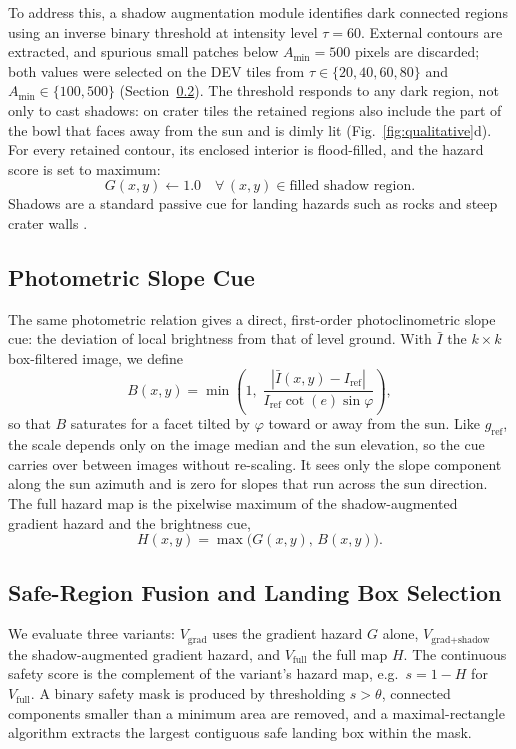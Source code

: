 \documentclass{article}
\begin{document}
To address this, a shadow augmentation module identifies dark connected regions using an inverse binary threshold at intensity level $\tau = 60$. External contours are extracted, and spurious small patches below $A_{\min} = 500$ pixels are discarded; both values were selected on the DEV tiles from $\tau \in \{20, 40, 60, 80\}$ and $A_{\min} \in \{100, 500\}$ (Section~\ref{sec:fusion}). The threshold responds to any dark region, not only to cast shadows: on crater tiles the retained regions also include the part of the bowl that faces away from the sun and is dimly lit (Fig.~\ref{fig:qualitative}d). For every retained contour, its enclosed interior is flood-filled, and the hazard score is set to maximum:
\begin{equation}
    G(x,y) \leftarrow 1.0 \quad \forall\,(x,y) \in \text{filled shadow region}.
\end{equation}
Shadows are a standard passive cue for landing hazards such as rocks and steep crater walls \cite{huertas2006passive,golombek2008rocks}.

\subsection{Photometric Slope Cue}
\label{sec:bright}
The same photometric relation gives a direct, first-order photoclinometric slope cue: the deviation of local brightness from that of level ground. With $\bar I$ the $k \times k$ box-filtered image, we define
\begin{equation}
    B(x,y) = \min\!\left(1,\; \frac{|\bar I(x,y) - I_{\text{ref}}|}{I_{\text{ref}} \cot(e) \sin\varphi}\right),
\end{equation}
so that $B$ saturates for a facet tilted by $\varphi$ toward or away from the sun. Like $g_{\text{ref}}$, the scale depends only on the image median and the sun elevation, so the cue carries over between images without re-scaling. It sees only the slope component along the sun azimuth and is zero for slopes that run across the sun direction. The full hazard map is the pixelwise maximum of the shadow-augmented gradient hazard and the brightness cue,
\begin{equation}
    H(x,y) = \max\big(G(x,y),\, B(x,y)\big).
\end{equation}

\subsection{Safe-Region Fusion and Landing Box Selection}
\label{sec:fusion}
We evaluate three variants: $V_{\text{grad}}$ uses the gradient hazard $G$ alone, $V_{\text{grad+shadow}}$ the shadow-augmented gradient hazard, and $V_{\text{full}}$ the full map $H$. The continuous safety score is the complement of the variant's hazard map, e.g.\ $s = 1 - H$ for $V_{\text{full}}$. A binary safety mask is produced by thresholding $s > \theta$, connected components smaller than a minimum area are removed, and a maximal-rectangle algorithm \cite{vandevoorde1998maximal} extracts the largest contiguous safe landing box within the mask.
\end{document}
